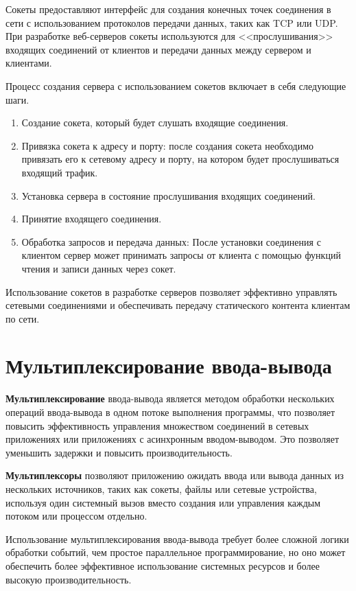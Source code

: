 Сокеты предоставляют интерфейс для создания конечных точек соединения в сети с использованием протоколов передачи данных, таких как TCP или UDP. При разработке веб-серверов сокеты используются для <<прослушивания>> входящих соединений от клиентов и передачи данных между сервером и клиентами.

Процесс создания сервера с использованием сокетов включает в себя следующие шаги.

\begin{enumerate}[label*=\arabic*.]
	\item Создание сокета, который будет слушать входящие соединения.
	\item Привязка сокета к адресу и порту: после создания сокета необходимо привязать его к сетевому адресу и порту, на котором будет прослушиваться входящий трафик.
	\item Установка сервера в состояние прослушивания входящих соединений.
	\item Принятие входящего соединения.
	\item Обработка запросов и передача данных: После установки соединения с клиентом сервер может принимать запросы от клиента с помощью функций чтения и записи данных через сокет.
\end{enumerate}

Использование сокетов в разработке серверов позволяет эффективно управлять сетевыми соединениями и обеспечивать передачу статического контента клиентам по сети.



\section{Мультиплексирование ввода-вывода}

\textbf{Мультиплексирование} ввода-вывода является методом обработки нескольких операций ввода-вывода в одном потоке выполнения программы, что позволяет повысить эффективность управления множеством соединений в сетевых приложениях или приложениях с асинхронным вводом-выводом. Это позволяет уменьшить задержки и повысить производительность.

\textbf{Мультиплексоры} позволяют приложению ожидать ввода или вывода данных из нескольких источников, таких как сокеты, файлы или сетевые устройства, используя один системный вызов вместо создания или управления каждым потоком или процессом отдельно.

Использование мультиплексирования ввода-вывода требует более сложной логики обработки событий, чем простое параллельное программирование, но оно может обеспечить более эффективное использование системных ресурсов и более высокую производительность.

